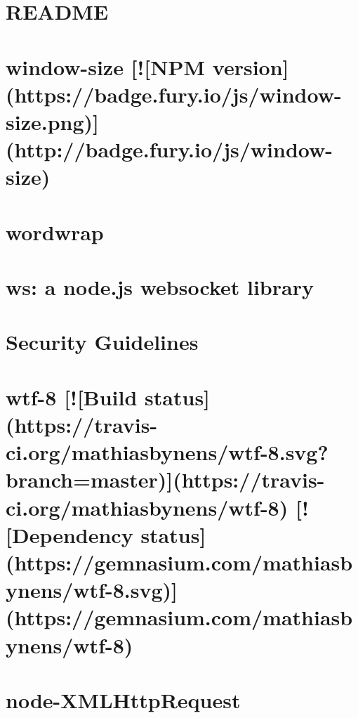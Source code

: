 \documentclass[twoside]{book}
\newcommand{\+}{\discretionary{\mbox{\scriptsize$\hookleftarrow$}}{}{}}
\begin{document}
\chapter{R\+E\+A\+D\+ME}
\label{md_app_web_node_modules_which__r_e_a_d_m_e}

\chapter{window-\/size \mbox{[}!\mbox{[}N\+PM version\mbox{]}(https\+://badge.fury.\+io/js/window-\/size.png)\mbox{]}(http\+://badge.fury.\+io/js/window-\/size)}
\label{md_app_web_node_modules_window-size__r_e_a_d_m_e}

\chapter{wordwrap}
\label{md_app_web_node_modules_wordwrap__r_e_a_d_m_e}

\chapter{ws\+: a node.\+js websocket library}
\label{md_app_web_node_modules_ws__r_e_a_d_m_e}

\chapter{Security Guidelines}
\label{md_app_web_node_modules_ws__s_e_c_u_r_i_t_y}

\chapter{wtf-\/8 \mbox{[}!\mbox{[}Build status\mbox{]}(https\+://travis-\/ci.org/mathiasbynens/wtf-\/8.svg?branch=master)\mbox{]}(https\+://travis-\/ci.org/mathiasbynens/wtf-\/8) \mbox{[}!\mbox{[}Dependency status\mbox{]}(https\+://gemnasium.com/mathiasbynens/wtf-\/8.svg)\mbox{]}(https\+://gemnasium.com/mathiasbynens/wtf-\/8)}
\label{md_app_web_node_modules_wtf-8__r_e_a_d_m_e}

\chapter{node-\/\+X\+M\+L\+Http\+Request}
\label{md_app_web_node_modules_xmlhttprequest-ssl__r_e_a_d_m_e}

\end{document}
